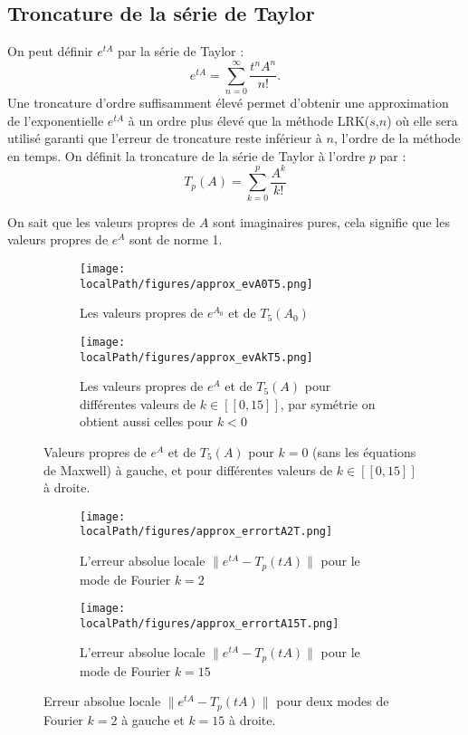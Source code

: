 \subsection{Troncature de la série de Taylor}

On peut définir $e^{tA}$ par la série de Taylor :
$$
  e^{tA} = \sum_{n=0}^\infty \frac{t^nA^n}{n!}.
$$
Une troncature d'ordre suffisamment élevé permet d'obtenir une approximation de l'exponentielle $e^{tA}$ à un ordre plus élevé que la méthode LRK($s$,$n$) où elle sera utilisé garanti que l'erreur de troncature reste inférieur à $n$, l'ordre de la méthode en temps. On définit la troncature de la série de Taylor à l'ordre $p$ par :
$$
  T_p(A) = \sum_{k=0}^p \frac{A^k}{k!}
$$

On sait que les valeurs propres de $A$ sont imaginaires pures, cela signifie que les valeurs propres de $e^{A}$ sont de norme 1.

\begin{figure}
  \begin{subfigure}{.5\textwidth}
    \centering
    \texttt{[image: \\localPath/figures/approx\_evA0T5.png]}
    \caption{Les valeurs propres de $e^{A_0}$ et de $T_5(A_0)$}
  \end{subfigure}
  \begin{subfigure}{.5\textwidth}
    \centering
    \texttt{[image: \\localPath/figures/approx\_evAkT5.png]}
    \caption{Les valeurs propres de $e^{A}$ et de $T_5(A)$ pour différentes valeurs de $k\in[\![0,15]\!]$, par symétrie on obtient aussi celles pour $k<0$}
  \end{subfigure}
  \caption{Valeurs propres de $e^{A}$ et de $T_5(A)$ pour $k=0$ (sans les équations de Maxwell) à gauche, et pour différentes valeurs de $k\in[\![0,15]\!]$ à droite.}
\end{figure}


\begin{figure}
  \begin{subfigure}{.5\textwidth}
    \centering
    \texttt{[image: \\localPath/figures/approx\_errortA2T.png]}
    \caption{L'erreur absolue locale $\|e^{tA}-T_p(tA)\|$ pour le mode de Fourier $k=2$}
  \end{subfigure}
  \begin{subfigure}{.5\textwidth}
    \centering
    \texttt{[image: \\localPath/figures/approx\_errortA15T.png]}
    \caption{L'erreur absolue locale $\|e^{tA}-T_p(tA)\|$ pour le mode de Fourier $k=15$}
  \end{subfigure}
  \caption{Erreur absolue locale $\|e^{tA}-T_p(tA)\|$ pour deux modes de Fourier $k=2$ à gauche et $k=15$ à droite.}
\end{figure}

